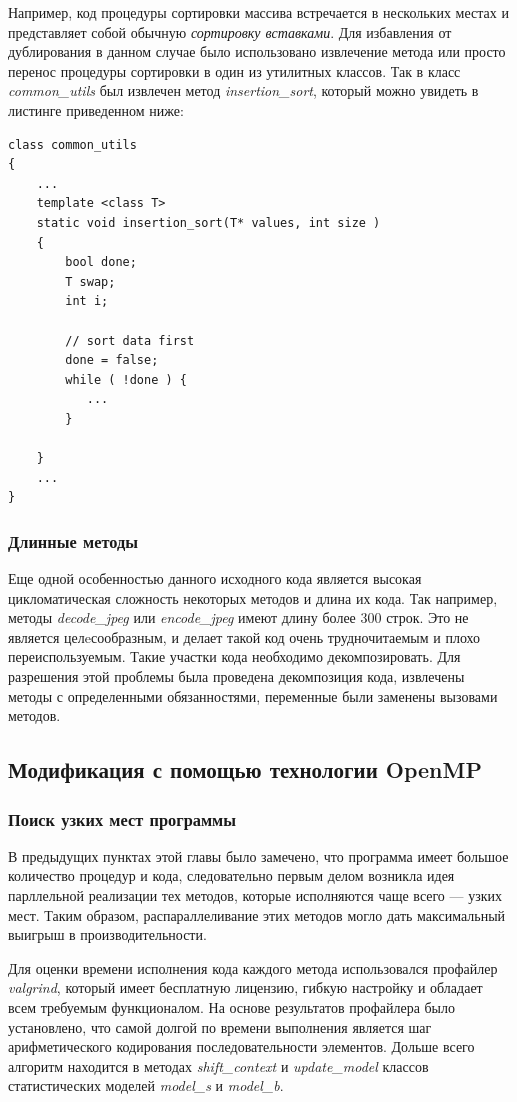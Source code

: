 \documentclass{matmex-diploma-custom}
\begin{document}
Например, код процедуры сортировки массива встречается в нескольких  местах и представляет собой обычную \emph{сортировку вставками}. Для избавления от дублирования в данном случае было использовано извлечение метода или  просто перенос процедуры сортировки в один из утилитных  классов. Так в класс \emph{common\_utils} был извлечен метод \emph{insertion\_sort}, который можно увидеть в листинге приведенном ниже:

\begin{lstlisting}
class common_utils
{
    ...
    template <class T>
    static void insertion_sort(T* values, int size )
    {
        bool done;
        T swap;
        int i;

        // sort data first
        done = false;
        while ( !done ) {
           ...
        }

    }
    ...
}
\end{lstlisting}

\subsubsection{Длинные методы}
Еще одной особенностью данного исходного кода является высокая цикломатическая сложность некоторых методов и длина их кода.  Так например, методы \emph{decode\_jpeg} или \emph{encode\_jpeg} имеют длину более 300 строк. Это не является целeсообразным, и делает такой код очень трудночитаемым и плохо переиспользуемым. Такие участки кода необходимо декомпозировать. Для разрешения этой проблемы была проведена декомпозиция кода, извлечены методы с определенными обязанностями, переменные были  заменены вызовами методов.

\subsection{Модификация с помощью технологии OpenMP}

\subsubsection{Поиск узких мест программы}
В предыдущих пунктах этой главы было замечено, что программа имеет большое количество процедур и кода, следовательно первым делом возникла идея парллельной реализации тех методов, которые исполняются чаще всего --- узких мест. Таким образом, распараллеливание этих методов могло дать максимальный выигрыш в производительности.

Для оценки времени исполнения кода каждого метода использовался профайлер \emph{valgrind}, который имеет бесплатную лицензию, гибкую настройку и обладает всем требуемым функционалом. На основе результатов профайлера было установлено, что самой долгой по времени выполнения является шаг арифметического кодирования последовательности элементов. Дольше всего алгоритм находится в методах \emph{shift\_context} и \emph{update\_model} классов статистических моделей \emph{model\_s} и \emph{model\_b}.
\end{document}
